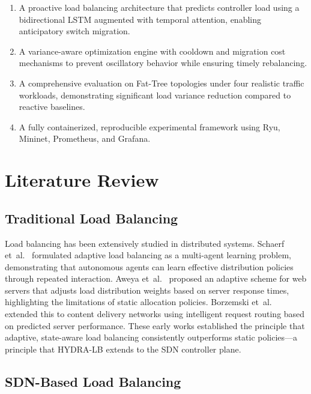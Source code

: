 \documentclass[12pt,a4paper]{report}
\begin{document}
\begin{enumerate}
    \item A proactive load balancing architecture that predicts controller load using a bidirectional LSTM augmented with temporal attention, enabling anticipatory switch migration.
    \item A variance-aware optimization engine with cooldown and migration cost mechanisms to prevent oscillatory behavior while ensuring timely rebalancing.
    \item A comprehensive evaluation on Fat-Tree topologies under four realistic traffic workloads, demonstrating significant load variance reduction compared to reactive baselines.
    \item A fully containerized, reproducible experimental framework using Ryu, Mininet, Prometheus, and Grafana.
\end{enumerate}

\chapter{Literature Review}

\section{Traditional Load Balancing}

Load balancing has been extensively studied in distributed systems. Schaerf et~al.~\cite{schaerf1994adaptive} formulated adaptive load balancing as a multi-agent learning problem, demonstrating that autonomous agents can learn effective distribution policies through repeated interaction. Aweya et~al.~\cite{aweya2002adaptive} proposed an adaptive scheme for web servers that adjusts load distribution weights based on server response times, highlighting the limitations of static allocation policies. Borzemski et~al.~\cite{borzemski2007adaptive} extended this to content delivery networks using intelligent request routing based on predicted server performance. These early works established the principle that adaptive, state-aware load balancing consistently outperforms static policies---a principle that HYDRA-LB extends to the SDN controller plane.

\section{SDN-Based Load Balancing}
\end{document}
